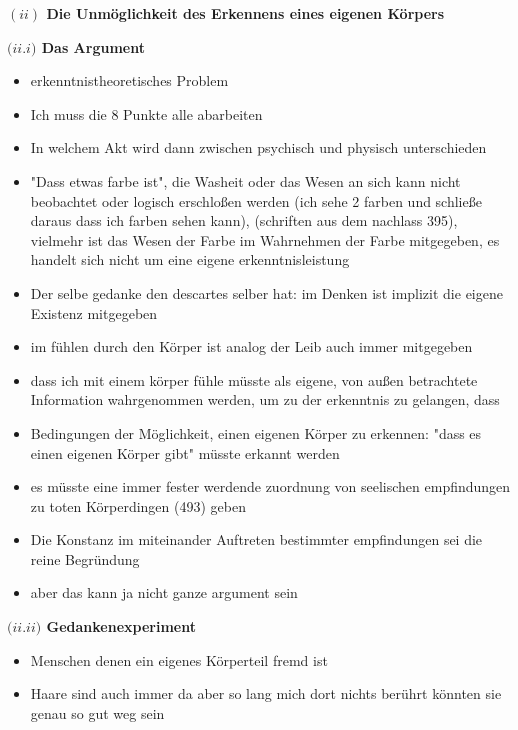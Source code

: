 \documentclass[a4paper, 12pt]{article}
\begin{document}
\begin{onehalfspace}
\vspace{5mm}
\noindent\textbf{$(ii)$ Die Unmöglichkeit des Erkennens eines eigenen Körpers}

\vspace{3mm}
\noindent\textbf{$(ii.$\footnotesize$i$\normalsize$)$ Das Argument}

\begin{itemize}
  \item erkenntnistheoretisches Problem
  \item Ich muss die 8 Punkte alle abarbeiten
  \item In welchem Akt wird dann zwischen psychisch und physisch unterschieden
  \item "Dass etwas farbe ist", die Washeit oder das Wesen an sich kann nicht beobachtet oder logisch erschloßen werden (ich sehe 2 farben und schließe daraus dass ich farben sehen kann), (schriften aus dem nachlass 395), vielmehr ist das Wesen der Farbe im Wahrnehmen der Farbe mitgegeben, es handelt sich nicht um eine eigene erkenntnisleistung
  \item Der selbe gedanke den descartes selber hat: im Denken ist implizit die eigene Existenz mitgegeben
  \item im fühlen durch den Körper ist analog der Leib auch immer mitgegeben
  \item dass ich mit einem körper fühle müsste als eigene, von außen betrachtete Information wahrgenommen werden, um zu der erkenntnis zu gelangen, dass 
  \item Bedingungen der Möglichkeit, einen eigenen Körper zu erkennen: "dass es einen eigenen Körper gibt" müsste erkannt werden
  \item es müsste eine immer fester werdende zuordnung von seelischen empfindungen zu toten Körperdingen (493) geben
  \item Die Konstanz im miteinander Auftreten bestimmter empfindungen sei die reine Begründung
  \item aber das kann ja nicht ganze argument sein
\end{itemize}

\vspace{3mm}
\noindent\textbf{$(ii.$\footnotesize$ii$\normalsize$)$ Gedankenexperiment}

\begin{itemize}
  \item Menschen denen ein eigenes Körperteil fremd ist
  \item Haare sind auch immer da aber so lang mich dort nichts berührt könnten sie genau so gut weg sein
\end{itemize}



\end{onehalfspace}
\end{document}
